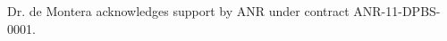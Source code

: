 \documentclass[runningheads]{llncs}
\begin{document}
\begin{credits}

\subsubsection{\ackname} Dr. de Montera acknowledges support by ANR under contract ANR-11-DPBS-0001.


\end{credits}
%
%
%


%
\end{document}
